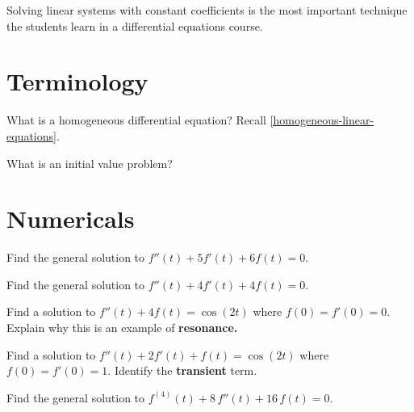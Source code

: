 \documentclass{homework}
\author{Jim Fowler}
\begin{document}
\maketitle

\begin{inspiration}
  Solving linear systems with constant coefficients is the most
  important technique the students learn in a differential equations
  course.
\end{inspiration}

\section{Terminology}

\begin{problem}
  What is a homogeneous differential equation?  Recall \ref{homogeneous-linear-equations}.
\end{problem}

\begin{problem}
  What is an initial value problem?
\end{problem}

\section{Numericals}

\begin{problem}
  Find the general solution to $f''(t) + 5 f'(t) + 6 f(t) = 0$.
\end{problem}

\begin{problem}
  Find the general solution to $f''(t) + 4 f'(t) + 4 f(t) = 0$.
\end{problem}

\begin{problem}\label{resonance-example}Find a solution to $f''(t) + 4 f(t) = \cos (2t)$ where $f(0) = f'(0) = 0$.  Explain why this is an example of \textbf{resonance.}
\end{problem}

\begin{problem}
  Find a solution to $f''(t) + 2f'(t) + f(t) = \cos (2t)$ where $f(0) = f'(0) = 1$.  Identify the \textbf{transient} term.
\end{problem}

\begin{problem}
  Find the general solution to $f^{(4)}(t) + 8\,f''(t) + 16\,f(t) = 0$.
\end{problem}
\end{document}
